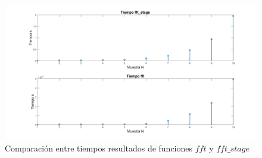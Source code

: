 \documentclass[letterpaper,onecolumn,10pt,journal,final]{IEEEtran}
\begin{document}
\begin{enumerate}[1)]
\begin{figure}[H]
\centering
\includegraphics[width=\linewidth]{Figuras/VI4.png}
\caption{Comparación entre tiempos resultados de funciones $fft$ y $fft\_stage$}
\label{VI4}
\end{figure}
\end{enumerate}
%
%
\end{document}
